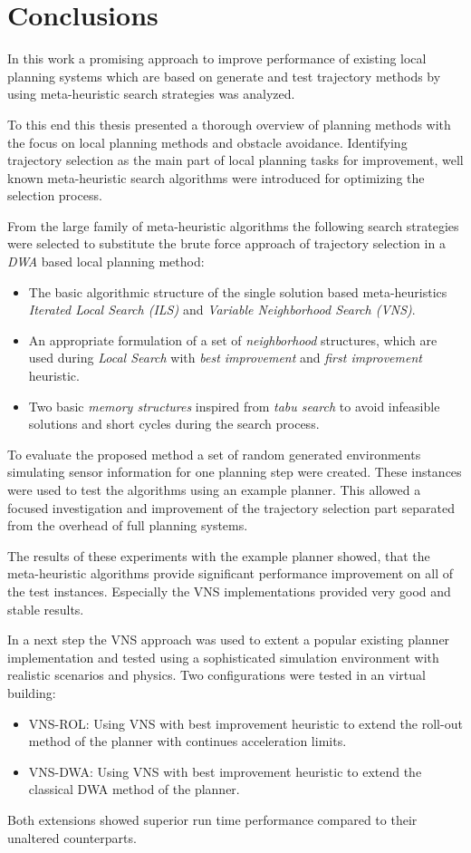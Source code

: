 \chapter{Conclusions}\label{ch:conc}
In this work a promising approach to improve performance of existing local planning systems which are based on generate and test trajectory methods by using meta-heuristic search strategies was analyzed.

To this end this thesis presented a thorough overview of planning methods with the focus on local planning methods and obstacle avoidance. 
Identifying trajectory selection as the main part of local planning tasks for improvement, well known meta-heuristic search algorithms were introduced for optimizing the selection process.

From the large family of meta-heuristic algorithms the following search strategies were selected to substitute the brute force approach of trajectory selection in a \emph{DWA} based local planning method:
\begin{itemize}
\item The basic algorithmic structure of the single solution based meta-heuristics \emph{Iterated Local Search (ILS)} and \emph{Variable Neighborhood Search (VNS)}.
\item An appropriate formulation of a set of \emph{neighborhood} structures, which are used during \emph{Local Search}  with \emph{best improvement} and \emph{first improvement} heuristic.
\item Two basic \emph{memory structures} inspired from \emph{tabu search} to avoid infeasible solutions and short cycles during the search process. 
\end{itemize}

To evaluate the proposed method a set of random generated environments simulating sensor information for one planning step were created. 
These instances were used to test the algorithms using an example planner. 
This allowed a focused investigation and improvement of the trajectory selection part separated from the overhead of full planning systems.

The results of these experiments with the example planner showed, that the meta-heuristic algorithms provide significant performance improvement on all of the test instances. Especially the VNS implementations provided very good and stable results. 

In a next step the VNS approach was used to extent a popular existing planner implementation and tested using a sophisticated simulation environment with realistic scenarios and physics. Two configurations were tested in an virtual building:
\begin{itemize}
\item VNS-ROL: Using VNS with best improvement heuristic to extend the roll-out method of the planner with continues acceleration limits.
\item VNS-DWA: Using VNS with best improvement heuristic to extend the classical DWA method of the planner.
\end{itemize}
Both extensions showed superior run time performance compared to their unaltered counterparts.

